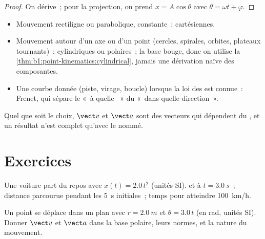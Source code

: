 \begin{proof}
On dérive~; pour la projection, on prend $x = A\cos\theta$ avec $\theta =
\omega t + \varphi$.
\end{proof}

\begin{method}\label{met:b1:point-kinematics:choose}
\begin{itemize}
  \item Mouvement rectiligne ou parabolique,  constante~:
        cartésiennes.
  \item Mouvement autour d'un axe ou d'un point (cercles, spirales,
        orbites, plateaux tournants)~: cylindriques ou polaires~; la
        base bouge, donc on utilise la
        \cref{thm:b1:point-kinematics:cylindrical}, jamais une dérivation
        naïve des composantes.
  \item Une courbe donnée (piste, virage, boucle) lorsque la loi des
         est connue~: Frenet, qui sépare le «~à quelle ~»
        du «~dans quelle direction~».
\end{itemize}
Quel que soit le choix, $\vect v$ et $\vect a$ sont des vecteurs qui
dépendent du , et un résultat n'est complet qu'avec le
 nommé.
\end{method}

\section{Exercices}

\begin{exercise}[$\star$]\label{exo:b1:point-kinematics:1}
Une voiture part du repos avec $x(t) = 2.0\,t^2$ (unités SI).  et
 à $t = \qty{3.0}{s}$~; distance parcourue pendant les
\qty{5}{s} initiales~; temps pour atteindre \qty{100}{km/h}.
\end{exercise}

\begin{exercise}[$\star$]\label{exo:b1:point-kinematics:2}
Un point se déplace dans un plan avec $r = \qty{2.0}{m}$ et $\theta = 3.0\,t$
(en rad, unités SI). Donner $\vect v$ et $\vect a$ dans la base polaire,
leurs normes, et la nature du mouvement.
\end{exercise}

